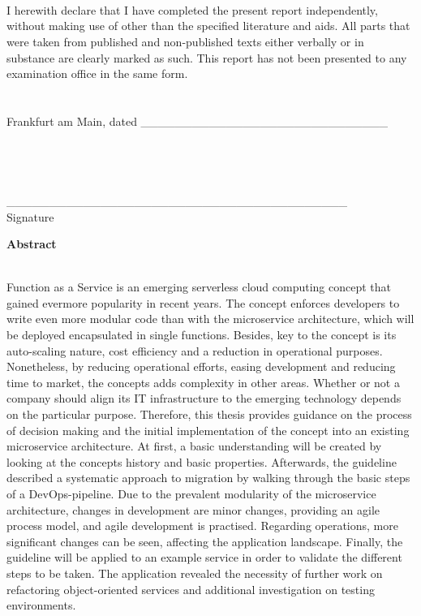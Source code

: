 \documentclass[a4paper,11pt, pagesize]{scrartcl}
\begin{document}
\begin{spacing}{1.2}
\begin{flushleft}
\end{flushleft}
~\\\\\\
I herewith declare that I have completed the present report independently, without making use of other than the specified literature and aids. All parts that were taken from published and non-published texts either verbally or in substance are clearly marked as such.  This report has not been presented to any examination office in the same form.  \\\\\\
Frankfurt am Main, dated  \_\_\_\_\_\_\_\_\_\_\_\_\_\_\_\_\_\_\_\_\_\_\_\_\_\_\_\_\_    
\\\\\\\\\\
\_\_\_\_\_\_\_\_\_\_\_\_\_\_\_\_\_\_\_\_\_\_\_\_\_\_\_\_\_\_\_\_\_\_\_\_\_\_\_\_\\Signature 
\newpage
\begin{flushleft}
  {\Large \textbf {Abstract}}\\\\
\end{flushleft} 
Function as a Service is an emerging serverless cloud computing concept that gained evermore popularity in recent years. The concept enforces developers to write even more modular code than with the microservice architecture, which will be deployed encapsulated in single functions. Besides, key to the concept is its auto-scaling nature, cost efficiency and a reduction in operational purposes. Nonetheless, by reducing operational efforts, easing development and reducing time to market, the concepts adds complexity in other areas. Whether or not a company should align its IT infrastructure to the emerging technology depends on the particular purpose. Therefore, this thesis provides guidance on the process of decision making and the initial implementation of the concept into an existing microservice architecture. At first, a basic understanding will be created by looking at the concepts history and basic properties. Afterwards, the guideline described a systematic approach to migration by walking through the basic steps of a DevOps-pipeline. Due to the prevalent modularity of the microservice architecture, changes in development are minor changes, providing an agile process model, and agile development is practised. Regarding operations, more significant changes can be seen, affecting the application landscape. Finally, the guideline will be applied to an example service in order to validate the different steps to be taken. The application revealed the necessity of further work on refactoring object-oriented services and additional investigation on testing environments.   

\end{spacing}
\end{document}
